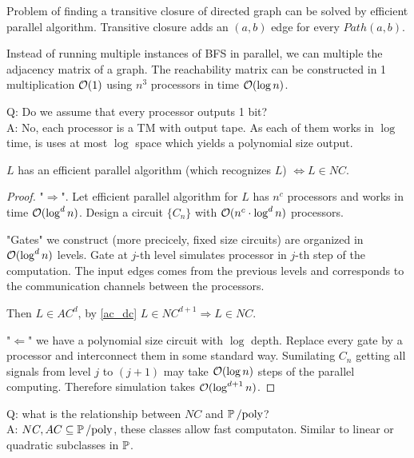 \begin{example}
	Problem of finding a transitive closure of directed graph can be solved by efficient parallel algorithm.
	Transitive closure adds an $(a, b)$ edge for every $Path(a, b)$.

	Instead of running multiple instances of BFS in parallel, we can multiple the adjacency matrix of a graph.
	The reachability matrix can be constructed in 1 multiplication $\mathcal{O}(1)$ using $n^3$ processors in time $\mathcal{O}(\log n)$.
\end{example}

Q: Do we assume that every processor outputs 1 bit?\\
A: No, each processor is a TM with output tape. As each of them works in $\log$ time, is uses at most $\log$ space which yields a polynomial size output.

\begin{theorem}
	$L$ has an efficient parallel algorithm (which recognizes $L$) $\iff L \in NC$.
\end{theorem}
\begin{proof}
	"$\Rightarrow$". Let efficient parallel algorithm for $L$ has $n^c$ processors and works in time $\mathcal{O}(\log^d n)$.
	Design a circuit $\{ C_n \}$ with $\mathcal{O}(n^c \cdot \log^d n)$ processors.

	"Gates" we construct (more precicely, fixed size circuits) are organized in $\mathcal{O}(\log^d n)$ levels.
	Gate at $j$-th level simulates processor in $j$-th step of the computation.
	The input edges comes from the previous levels and corresponds to the communication channels between the processors.

	Then $L \in AC^d$, by \cref{ac_dc} $L \in NC^{d + 1} \Rightarrow L \in NC$.

	"$\Leftarrow$" we have a polynomial size circuit with $\log$ depth.
	Replace every gate by a processor and interconnect them in some standard way.
	Sumilating $C_n$ getting all signals from level $j$ to $(j + 1)$ may take $\mathcal{O}(\log n)$ steps of the parallel computing.
	Therefore simulation takes $\mathcal{O}(\log^{d + 1} n)$.
\end{proof}

Q: what is the relationship between $NC$ and $\operatorname{\operatorname{\mathbb{P}}/poly}$?\\
A: $NC, AC \subseteq \operatorname{\operatorname{\mathbb{P}}/poly}$, these classes allow fast computaton. Similar to linear or quadratic subclasses in $\operatorname{\mathbb{P}}$.
